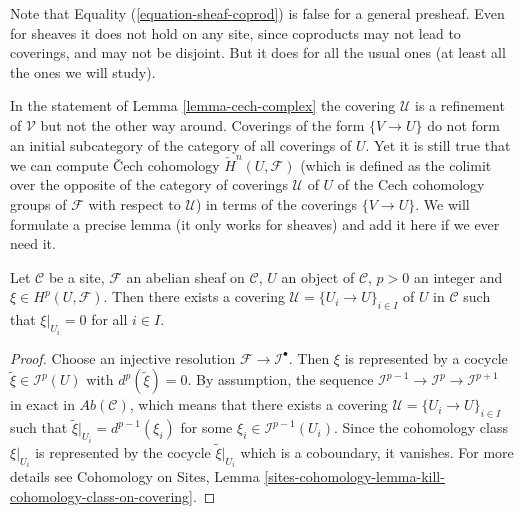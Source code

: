 \noindent
Note that Equality (\ref{equation-sheaf-coprod})
is false for a general presheaf. Even for sheaves it does not hold on any
site, since coproducts may not lead to coverings, and may not be disjoint.
But it does for all the usual ones (at least all the ones we will study).

\begin{remark}
\label{remark-refinement}
In the statement of Lemma \ref{lemma-cech-complex} the covering $\mathcal{U}$
is a refinement of $\mathcal{V}$ but not the other way around. Coverings
of the form $\{V \to U\}$ do not form an initial subcategory of the
category of all coverings of $U$. Yet it is still true that
we can compute {\v C}ech cohomology $\check H^n(U, \mathcal{F})$ (which
is defined as the colimit over the opposite of the category of
coverings $\mathcal{U}$ of $U$ of the Cech cohomology groups of
$\mathcal{F}$ with respect to $\mathcal{U}$) in terms of the coverings
$\{V \to U\}$. We will formulate a precise lemma (it only works for sheaves)
and add it here if we ever need it.
\end{remark}

\begin{lemma}
\label{lemma-locality-cohomology}
Let $\mathcal{C}$ be a site, $\mathcal{F}$ an abelian sheaf on $\mathcal{C}$,
$U$ an object of $\mathcal{C}$, $p >0$ an integer and $\xi \in
H^p(U, \mathcal{F})$. Then there exists a covering
$\mathcal{U} = \{U_i \to U\}_{i \in I}$ of $U$ in $\mathcal{C}$
such that $\xi |_{U_i} = 0$ for all $i \in I$.
\end{lemma}

\begin{proof}
Choose an injective resolution $\mathcal{F} \to \mathcal{I}^\bullet$. Then
$\xi$ is represented by a cocycle $\tilde{\xi} \in \mathcal{I}^p(U)$
with $d^p(\tilde{\xi}) = 0$. By assumption, the sequence
$\mathcal{I}^{p - 1} \to \mathcal{I}^p \to \mathcal{I}^{p + 1}$ in exact in
$\textit{Ab}(\mathcal{C})$, which means that there exists a covering
$\mathcal{U} = \{U_i \to U\}_{i \in I}$ such that
$\tilde{\xi}|_{U_i} = d^{p - 1}(\xi_i)$ for some
$\xi_i \in \mathcal{I}^{p-1}(U_i)$. Since
the cohomology class $\xi|_{U_i}$ is represented by the cocycle
$\tilde{\xi}|_{U_i}$ which is a coboundary, it vanishes.
For more details see
Cohomology on Sites,
Lemma \ref{sites-cohomology-lemma-kill-cohomology-class-on-covering}.
\end{proof}

